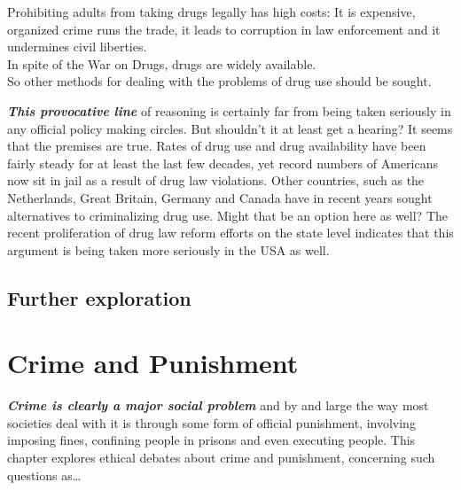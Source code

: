 \documentclass[
  12pt, openany]{book}
\begin{document}
\begin{center}

\begin{argument}

Prohibiting adults from taking drugs legally has high costs: It is expensive, organized crime runs the trade, it leads to corruption in law enforcement and it undermines civil liberties.\\
In spite of the War on Drugs, drugs are widely available.\\

So other methods for dealing with the problems of drug use should be sought.

\end{argument}

\end{center}

\textbf{\emph{This provocative line}} of reasoning is certainly far from being taken seriously in any official policy making circles. But shouldn't it at least get a hearing? It seems that the premises are true. Rates of drug use and drug availability have been fairly steady for at least the last few decades, yet record numbers of Americans now sit in jail as a result of drug law violations. Other countries, such as the Netherlands, Great Britain, Germany and Canada have in recent years sought alternatives to criminalizing drug use. Might that be an option here as well? The recent proliferation of drug law reform efforts on the state level indicates that this argument is being taken more seriously in the USA as well.

\hypertarget{further-exploration-8}{%
\section*{Further exploration}\label{further-exploration-8}}


\hypertarget{crime-and-punishment}{%
\chapter{Crime and Punishment}\label{crime-and-punishment}}

\textbf{\emph{Crime is clearly a major social problem}} and by and large the way most societies deal with it is through some form of official punishment, involving imposing fines, confining people in prisons and even executing people. This chapter explores ethical debates about crime and punishment, concerning such questions as\ldots{}
\end{document}

